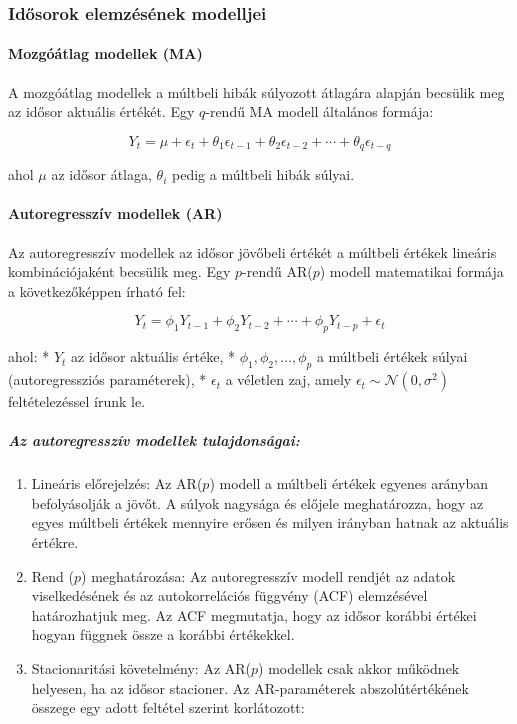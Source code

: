 \documentclass[11pt]{article}
\providecommand{\tightlist}{%
      \setlength{\itemsep}{0pt}\setlength{\parskip}{0pt}}
\begin{document}
    \subsubsection{Idősorok elemzésének
modelljei}\label{idux151sorok-elemzuxe9suxe9nek-modelljei}

\paragraph{Mozgóátlag modellek (MA)}\label{mozguxf3uxe1tlag-modellek-ma}

A mozgóátlag modellek a múltbeli hibák súlyozott átlagára alapján
becsülik meg az idősor aktuális értékét. Egy \(q\)-rendű MA modell
általános formája:

\[Y_t = \mu + \epsilon_t + \theta_1 \epsilon_{t-1} + \theta_2 \epsilon_{t-2} + \cdots + \theta_q \epsilon_{t-q}\]

ahol \(\mu\) az idősor átlaga, \(\theta_i\) pedig a múltbeli hibák
súlyai.

\paragraph{Autoregresszív modellek
(AR)}\label{autoregresszuxedv-modellek-ar}

Az autoregresszív modellek az idősor jövőbeli értékét a múltbeli értékek
lineáris kombinációjaként becsülik meg. Egy \(p\)-rendű AR(\(p\)) modell
matematikai formája a következőképpen írható fel:

\[Y_t = \phi_1 Y_{t-1} + \phi_2 Y_{t-2} + \cdots + \phi_p Y_{t-p} + \epsilon_t\]

ahol: * \(Y_t\) az idősor aktuális értéke, *
\(\phi_1, \phi_2, \ldots, \phi_p\) a múltbeli értékek súlyai
(autoregressziós paraméterek), * \(\epsilon_t\) a véletlen zaj, amely
\(\epsilon_t \sim \mathcal{N}(0, \sigma^2)\) feltételezéssel írunk le.

\subparagraph{Az autoregresszív modellek
tulajdonságai:}\label{az-autoregresszuxedv-modellek-tulajdonsuxe1gai}

\begin{enumerate}
\def\labelenumi{\arabic{enumi}.}
\tightlist
\item
  Lineáris előrejelzés: Az AR(\(p\)) modell a múltbeli értékek egyenes
  arányban befolyásolják a jövőt. A súlyok nagysága és előjele
  meghatározza, hogy az egyes múltbeli értékek mennyire erősen és milyen
  irányban hatnak az aktuális értékre.
\item
  Rend (\(p\)) meghatározása: Az autoregresszív modell rendjét az adatok
  viselkedésének és az autokorrelációs függvény (ACF) elemzésével
  határozhatjuk meg. Az ACF megmutatja, hogy az idősor korábbi értékei
  hogyan függnek össze a korábbi értékekkel.
\item
  Stacionaritási követelmény: Az AR(\(p\)) modellek csak akkor működnek
  helyesen, ha az idősor stacioner. Az AR-paraméterek abszolútértékének
  összege egy adott feltétel szerint korlátozott:
\end{enumerate}
\end{document}
